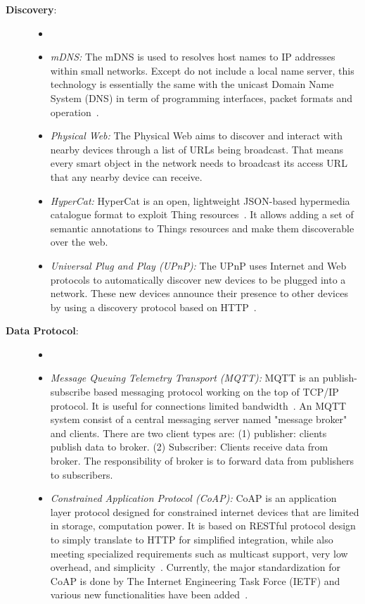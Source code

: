 \begin{description}
\item[\textbf{Discovery}:\\]
    \begin{itemize}
    \item[] 
    \item \textit{mDNS: } The mDNS is used to resolves host names to IP addresses within small networks. Except do not include a local name server,  this technology is essentially the same with the unicast Domain Name System (DNS) in term of programming interfaces, packet formats and operation~\cite{cheshire2013multicast}. 
    \item \textit{Physical Web: } The Physical Web aims to discover and interact with nearby devices through a list of URLs being broadcast. That means every smart object in the network needs to broadcast its access URL that any nearby device can receive. 
    \item \textit{HyperCat: } HyperCat is an open, lightweight JSON-based hypermedia catalogue format to exploit Thing resources~\cite{HyperCat76:online}. It allows adding a set of semantic annotations to Things resources and make them discoverable over the web. 
    \item \textit{Universal Plug and Play (UPnP): } The UPnP uses Internet and Web protocols to automatically discover new devices to be plugged into a network. These new devices announce their presence to other devices by using a discovery protocol based on HTTP~\cite{RFC6970U68:online}. 
    
    
    \end{itemize}

\item[\textbf{Data Protocol}:\\]
    \begin{itemize}
    \item[] 
    \item \textit{Message Queuing Telemetry Transport (MQTT): } MQTT  is an publish-subscribe based messaging protocol working on the top of TCP/IP protocol. It is useful for connections limited bandwidth~\cite{}. An MQTT system consist of a central messaging server named "message broker" and clients. There are two client types are: (1) publisher: clients publish data to broker. (2) Subscriber: Clients receive data from broker. The responsibility of broker is to forward data from publishers to subscribers. 
    
    \item \textit{Constrained Application Protocol (CoAP): } CoAP  is an application layer protocol designed for constrained internet devices that are limited in storage, computation power. It is based on RESTful protocol design to simply translate to HTTP for simplified integration, while also meeting specialized requirements such as multicast support, very low overhead, and simplicity~\cite{RFC7252T93:online}. Currently, the major standardization for CoAP is done by The Internet Engineering Task Force (IETF) and various new functionalities have been added~\cite{colitti2011integrating}. 
    

\end{itemize}
\end{description}

